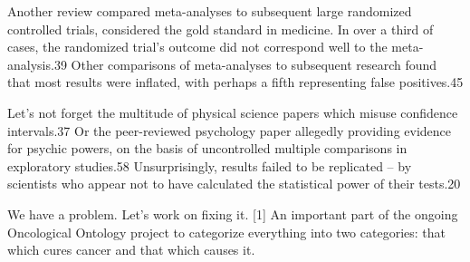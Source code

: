 Another review compared meta-analyses to subsequent large randomized controlled trials, considered the gold standard in medicine. In over a third of cases, the randomized trial’s outcome did not correspond well to the meta-analysis.39 Other comparisons of meta-analyses to subsequent research found that most results were inflated, with perhaps a fifth representing false positives.45

Let’s not forget the multitude of physical science papers which misuse confidence intervals.37 Or the peer-reviewed psychology paper allegedly providing evidence for psychic powers, on the basis of uncontrolled multiple comparisons in exploratory studies.58 Unsurprisingly, results failed to be replicated – by scientists who appear not to have calculated the statistical power of their tests.20

We have a problem. Let’s work on fixing it.
[1]	An important part of the ongoing Oncological Ontology project to categorize everything into two categories: that which cures cancer and that which causes it.